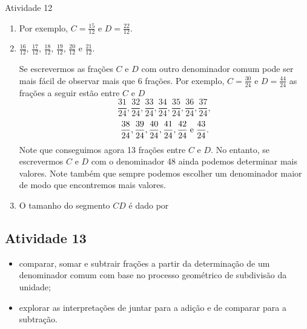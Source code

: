 \begin{multicols}{2}
\begin{resposta*}{Atividade 12}
\begin{enumerate} [\quad a)] %
  \item         Por exemplo, $C=\frac{15}{12}$     e     $D=\frac{22}{12}$.
  \item         $\frac{16}{12}$,     $\frac{17}{12}$,     $\frac{18}{12}$,     $\frac{19}{12}$,     $\frac{20}{12}$     e     $\frac{21}{12}$.
  
  Se escrevermos as frações     $C$     e     $D $     com outro denominador comum pode ser mais fácil de observar mais que 6 frações. Por exemplo,     $C=\frac{30}{24}$     e     $D=\frac{44}{24}$     as frações a seguir estão entre     $C$     e     $D$ $$\frac{31}{24}, \frac{32}{24}, \frac{33}{24}, \frac{34}{24}, \frac{35}{24}, \frac{36}{24}, \frac{37}{24},$$
  $$\frac{38}{24}, \frac{39}{24}, \frac{40}{24}, \frac{41}{24}, \frac{42}{24}\; {\rm e }\; \frac{43}{24}.$$
  Note que conseguimos agora 13 frações entre     $C$     e     $D$. No entanto, se escrevermos     $C$     e     $D$     com o denominador 48 ainda podemos determinar mais valores. Note também que sempre podemos escolher um denominador maior de modo que encontremos mais valores.
  \item     O tamanho do segmento     $CD$     é dado por
\end{enumerate} %
\end{resposta*}




\subsection{Atividade 13}

  \newline \vspace{.15cm}

  \begin{itemize} %
    \item       comparar, somar e subtrair frações a partir da determinação de um denominador comum com base no processo geométrico de subdivisão da unidade;
    \item       explorar as interpretações de juntar para a adição e de comparar para a subtração.
\end{itemize} %


   \vspace{.15cm}


\end{multicols}
